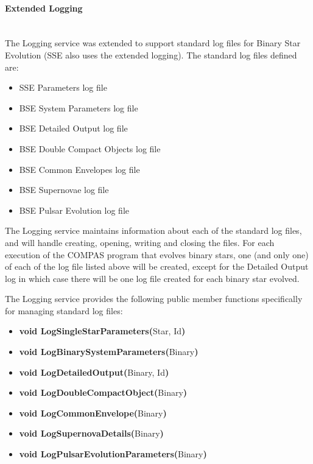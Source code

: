\newpage 
\paragraph{Extended Logging}\label{sec:ExtendedLogging}\mbox{} \\

The Logging service was extended to support standard log files for Binary Star Evolution (SSE also uses the extended logging). The standard log files defined are:

\begin{itemize}
    \item{SSE Parameters log file}
    \item{BSE System Parameters log file}
    \item{BSE Detailed Output log file}
    \item{BSE Double Compact Objects log file}
    \item{BSE Common Envelopes log file}
    \item{BSE Supernovae log file}
    \item{BSE Pulsar Evolution log file}
\end{itemize}

\medskip
The Logging service maintains information about each of the standard log files, and will handle creating, opening, writing and closing the files. For each execution of the COMPAS program that evolves binary stars, one (and only one) of each of the log file listed above will be created, except for the Detailed Output log in which case there will be one log file created for each binary star evolved.

The Logging service provides the following public member functions specifically for managing standard log files:

\begin{itemize}
    \item[]{\textbf{void LogSingleStarParameters(}Star, Id\textbf{)}}    
    \item[]{\textbf{void LogBinarySystemParameters(}Binary\textbf{)}}
    \item[]{\textbf{void LogDetailedOutput(}Binary, Id\textbf{)}}
    \item[]{\textbf{void LogDoubleCompactObject(}Binary\textbf{)}}
    \item[]{\textbf{void LogCommonEnvelope(}Binary\textbf{)}}
    \item[]{\textbf{void LogSupernovaDetails(}Binary\textbf{)}}                   
    \item[]{\textbf{void LogPulsarEvolutionParameters(}Binary\textbf{)}}
\end{itemize}


